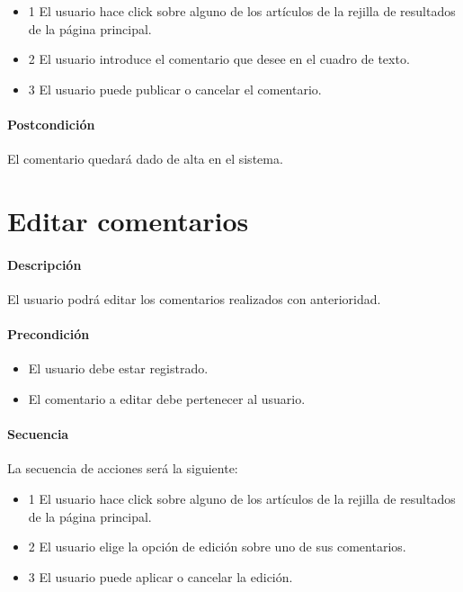 \begin{itemize}
	\item 1 El usuario hace click sobre alguno de los artículos de la rejilla de resultados de la página principal.
	\item 2 El usuario introduce el comentario que desee en el cuadro de texto.
	\item 3 El usuario puede publicar o cancelar el comentario.
\end{itemize}
	
\paragraph{Postcondición} El comentario quedará dado de alta en el sistema.


\section{Editar comentarios}

\paragraph{Descripción} El usuario podrá editar los comentarios realizados con anterioridad.

\paragraph{Precondición} 
\begin{itemize}
	\item El usuario debe estar registrado.
	\item El comentario a editar debe pertenecer al usuario.
\end{itemize}

\paragraph{Secuencia} La secuencia de acciones será la siguiente:

\begin{itemize}
	\item 1 El usuario hace click sobre alguno de los artículos de la rejilla de resultados de la página principal.
	\item 2 El usuario elige la opción de edición sobre uno de sus comentarios.
	\item 3 El usuario puede aplicar o cancelar la edición.
\end{itemize}

